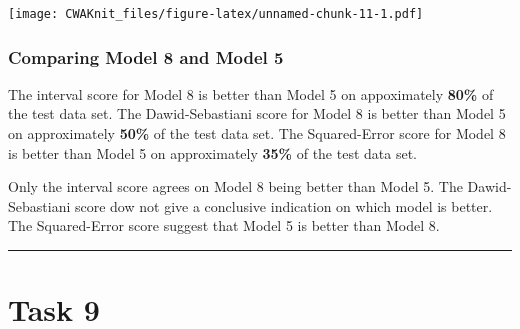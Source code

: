 \documentclass[]{article}
\begin{document}
\texttt{[image: CWAKnit\_files/figure-latex/unnamed-chunk-11-1.pdf]}

\subsubsection{Comparing Model 8 and Model
5}\label{comparing-model-8-and-model-5}

The interval score for Model 8 is better than Model 5 on appoximately
\textbf{80\%} of the test data set. The Dawid-Sebastiani score for Model
8 is better than Model 5 on approximately \textbf{50\%} of the test data
set. The Squared-Error score for Model 8 is better than Model 5 on
approximately \textbf{35\%} of the test data set.

Only the interval score agrees on Model 8 being better than Model 5. The
Dawid-Sebastiani score dow not give a conclusive indication on which
model is better. The Squared-Error score suggest that Model 5 is better
than Model 8.

\begin{center}\rule{0.5\linewidth}{\linethickness}\end{center}

\section{Task 9}\label{task-9}
\end{document}
